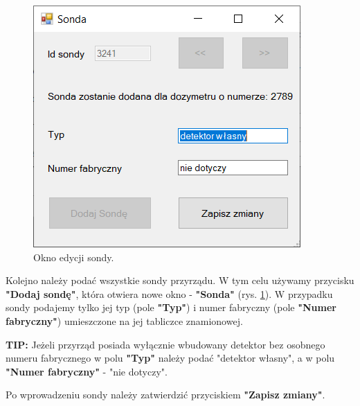\begin{figure}[htb]
	\centering
	\includegraphics{obrazki/Biuro/karta/edytuj_sonde.png}
	\caption{Okno edycji sondy.}
	\label{edytujSonde}
\end{figure}

Kolejno należy podać wszystkie sondy przyrządu. W tym celu używamy przycisku \textbf{"Dodaj sondę"}, która otwiera nowe okno - \textbf{"Sonda"} (rys. \ref{edytujSonde}). W przypadku sondy podajemy tylko jej typ (pole \textbf{"Typ"}) i numer fabryczny (pole \textbf{"Numer fabryczny"}) umieszczone na jej tabliczce znamionowej.

\textbf{TIP:} Jeżeli przyrząd posiada wyłącznie wbudowany detektor bez osobnego numeru fabrycznego w polu \textbf{"Typ"} należy podać "detektor własny", a w polu \textbf{"Numer fabryczny"} - "nie dotyczy". 

Po wprowadzeniu sondy należy zatwierdzić przyciskiem \textbf{"Zapisz zmiany"}. 

